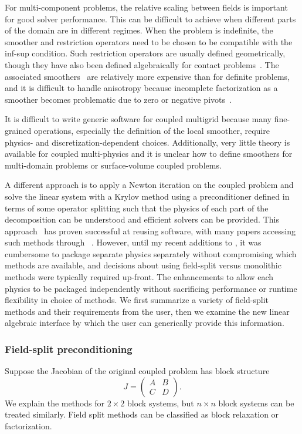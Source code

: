 For multi-component problems, the relative scaling between fields is important for good solver performance.
This can be difficult to achieve when different parts of the domain are in different regimes.
When the problem is indefinite, the smoother and restriction operators need to be chosen to be compatible with the inf-sup condition.
Such restriction operators are usually defined geometrically, though they have also been defined algebraically for contact problems~\citep{adams2004amm}.
The associated smoothers~\citep{vanka1986block} are relatively more expensive than for definite problems, and it is difficult to handle anisotropy because incomplete factorization as a smoother becomes problematic due to zero or negative pivots~\citep{higham2002accuracy,deniet2007solving}.

It is difficult to write generic software for coupled multigrid because many fine-grained operations, especially the definition of the local smoother, require physics- and discretization-dependent choices.
Additionally, very little theory is available for coupled multi-physics and it is unclear how to define smoothers for multi-domain problems or surface-volume coupled problems.

A different approach is to apply a Newton iteration on the coupled problem and solve the linear system with a Krylov method using a preconditioner defined in terms of some operator splitting such that the physics of each part of the decomposition can be understood and efficient solvers can be provided.
This approach~\citep{knoll2004jfn} has proven successful at reusing software, with many papers accessing such methods through {\PETSc}~\citep{petsc-web-page}.
However, until my recent additions to {\PETSc}, it was cumbersome to package separate physics separately without compromising which methods are available, and decisions about using field-split versus monolithic methods were typically required up-front.
The enhancements to {\PETSc} allow each physics to be packaged independently without sacrificing performance or runtime flexibility in choice of methods.
We first summarize a variety of field-split methods and their requirements from the user, then we examine the new linear algebraic interface by which the user can generically provide this information.

\subsubsection{Field-split preconditioning}\label{sec:multiphysics:fieldsplit}
Suppose the Jacobian of the original coupled problem has block structure
\begin{equation}\label{eq:fieldsplit:jacobian}
  J = \begin{pmatrix} A & B \\ C & D \end{pmatrix} .
\end{equation}
We explain the methods for $2\times 2$ block systems, but $n\times n$ block systems can be treated similarly.
Field split methods can be classified as block relaxation or factorization.

